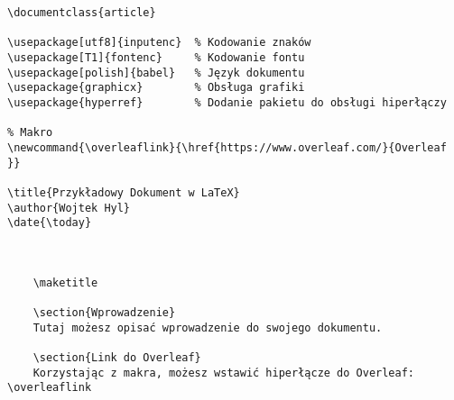 \begin{lstlisting}[caption={Przykład prostego dokumentu}, label=lst:Przykład prostego dokumentu]
\documentclass{article}

\usepackage[utf8]{inputenc}  % Kodowanie znaków 
\usepackage[T1]{fontenc}     % Kodowanie fontu
\usepackage[polish]{babel}   % Język dokumentu
\usepackage{graphicx}        % Obsługa grafiki
\usepackage{hyperref}        % Dodanie pakietu do obsługi hiperłączy

% Makro
\newcommand{\overleaflink}{\href{https://www.overleaf.com/}{Overleaf }}

\title{Przykładowy Dokument w LaTeX}
\author{Wojtek Hyl}
\date{\today}


	
	\maketitle
	
	\section{Wprowadzenie}
	Tutaj możesz opisać wprowadzenie do swojego dokumentu.
	
	\section{Link do Overleaf}
	Korzystając z makra, możesz wstawić hiperłącze do Overleaf: \overleaflink
	


\end{lstlisting}



